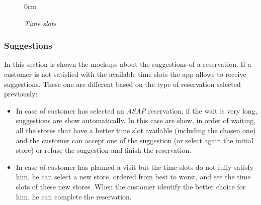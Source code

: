 \documentclass{article}
\begin{document}
\begin{figure}[!h]
\begin{adjustwidth} {0cm}{}
			\end{adjustwidth}
			\caption{\emph{Time slots}}
		\end{figure}
		
		\newpage
		
		\subsubsection{Suggestions}
		In this section is shown the mockups about the suggestions of a reservation. If a customer is not satisfied with the available time slots the app allows to receive suggestions. These one are different based on the type of reservation selected previously:
		\begin{itemize}
			\item In case of customer has selected an \emph{ASAP} reservation, if the wait is very long, suggestions are show automatically. In this case are show, in order of waiting, all the stores that have a better time slot available (including the chosen one) and the customer can accept one of the suggestion (or select again the initial store) or refuse the suggestion and finish the reservation.
			\item In case of customer has planned a visit but the time slots do not fully satisfy him, he can select a new store, ordered from best to worst, and see the time slots of these new stores. When the customer identify the better choice for him, he can complete the reservation.
		\end{itemize}
		\bigskip
		\bigskip
\end{document}
